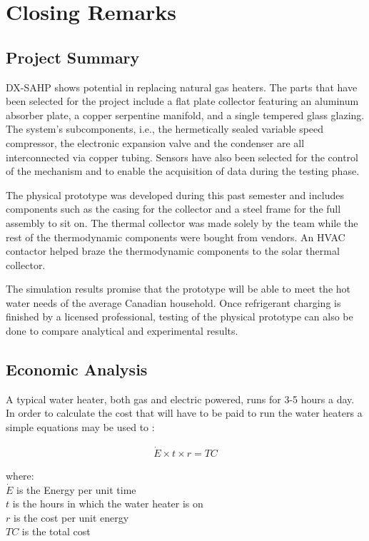 \chapter{Closing Remarks}

\section{Project Summary}

DX-SAHP shows potential in replacing natural gas heaters. The parts that have been selected for the project include a flat plate collector featuring an aluminum absorber plate, a copper serpentine manifold, and a single tempered glass glazing. The system’s subcomponents, i.e., the hermetically sealed variable speed compressor, the electronic expansion valve and the condenser are all interconnected via copper tubing. Sensors have also been selected for the control of the mechanism and to enable the acquisition of data during the testing phase. 

\medskip
The physical prototype was developed during this past semester and includes components such as the casing for the collector and a steel frame for the full assembly to sit on. The thermal collector was made solely by the team while the rest of the thermodynamic components were bought from vendors. An HVAC contactor helped braze the thermodynamic components to the solar thermal collector.

\medskip
The simulation results promise that the prototype will be able to meet the hot water needs of the average Canadian household. Once refrigerant charging is finished by a licensed professional, testing of the physical prototype can also be done to compare analytical and experimental results.

\section{Economic Analysis}

A typical water heater, both gas and electric powered, runs for 3-5 hours a day. In order to calculate the cost that will have to be paid to run the water heaters a simple equations may be used to \cite{energycalc}\cite{elecbill}:

\medskip
\begin{align}
    \dot E \times t \times r= TC
\end{align}

\medskip
where:
\\
$\dot E$ is the Energy per unit time
\\
$t$ is the hours in which the water heater is on
\\
$r$ is the cost per unit energy
\\
$TC$ is the total cost



